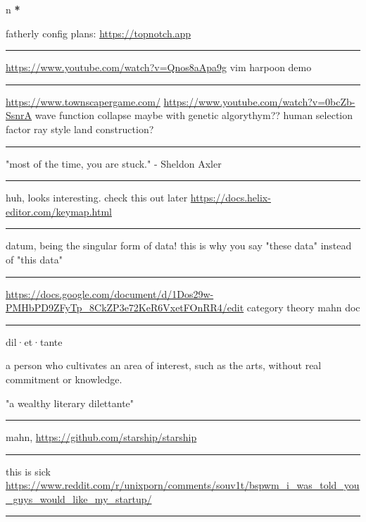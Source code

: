 \documentclass[letterpaper]{article}
\date{\today}
\title{}
\renewcommand{\tableofcontents}{}
\begin{document}
\tableofcontents

n \textbf{*}

fatherly config plans: \url{https://topnotch.app}

\noindent\rule{\textwidth}{0.5pt}

\url{https://www.youtube.com/watch?v=Qnos8aApa9g} vim harpoon demo

\noindent\rule{\textwidth}{0.5pt}

\href{https://www.youtube.com/redirect?event=video\_description\&redir\_token=QUFFLUhqbWU5b05DZzZyX0syeGltbVAzSUZGWkFySTFEZ3xBQ3Jtc0tuX1VZUTFUcHFsaklnd2FFYnlFV1pseDU3Q1hxMm40aWcybXVtMGNkVXhrYWVQaThuY0E2dXJNR2dkVm1rZ3A3NkVTZ2pJWEhVblVDV0ZKcXdFdFZTdHA5b3V4aXExVWFRLXVpeVhtSlpnNDhBYjU5Yw\&q=https\%3A\%2F\%2Fwww.townscapergame.com\%2F}{https://www.townscapergame.com/}
\url{https://www.youtube.com/watch?v=0bcZb-SsnrA} wave function collapse maybe
with genetic algorythym?? human selection factor ray style land
construction?

\noindent\rule{\textwidth}{0.5pt}

"most of the time, you are stuck." - Sheldon Axler

\noindent\rule{\textwidth}{0.5pt}

huh, looks interesting. check this out later
\url{https://docs.helix-editor.com/keymap.html}

\noindent\rule{\textwidth}{0.5pt}

datum, being the singular form of data! this is why you say "these data"
instead of "this data"

\noindent\rule{\textwidth}{0.5pt}

\url{https://docs.google.com/document/d/1Dos29w-PMHbPD9ZFyTp\_8CkZP3e72KeR6VxetFOnRR4/edit}
category theory mahn doc

\noindent\rule{\textwidth}{0.5pt}

dil·et·tante

a person who cultivates an area of interest, such as the arts, without
real commitment or knowledge.

"a wealthy literary dilettante"

\noindent\rule{\textwidth}{0.5pt}

mahn, \url{https://github.com/starship/starship}

\noindent\rule{\textwidth}{0.5pt}

this is sick
\url{https://www.reddit.com/r/unixporn/comments/souv1t/bspwm\_i\_was\_told\_you\_guys\_would\_like\_my\_startup/}

\noindent\rule{\textwidth}{0.5pt}
\end{document}
